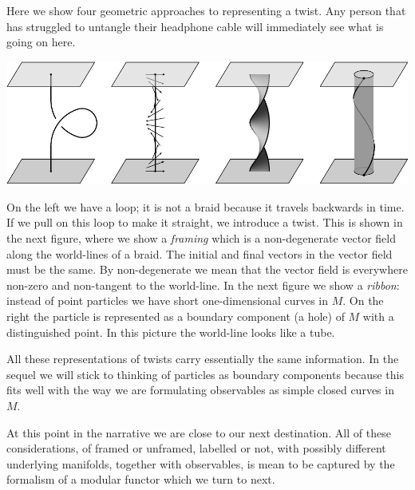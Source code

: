 \documentclass[aps, tightenlines, letterpaper, onecolumn, superscriptaddress, notitlepage, 11pt, groupedaddress]{revtex4-1}
\begin{document}
Here we show four 
geometric approaches to representing a twist.
Any person that has struggled to untangle their headphone cable
will immediately see what is going on here.
\begin{center}
\includegraphics[]{pic-framed.pdf}
\end{center}
On the left we have a loop; it is not a braid because it
travels backwards in time.
If we pull on this loop to make it straight, we introduce a twist.
This is shown in the next figure, 
where we show a \emph{framing} which is a non-degenerate 
vector field along the world-lines of a braid.
The initial and final vectors in the vector field must be the same.
By non-degenerate we mean that the vector field is everywhere
non-zero and non-tangent to the world-line.
In the next figure we show a \emph{ribbon}:
instead of point particles we have short one-dimensional curves in $M$.
On the right the particle is represented as a boundary
component (a hole) of $M$ with a distinguished point.
In this picture the world-line looks like a tube.

All these representations of twists carry
essentially the same information.
In the sequel we will stick
to thinking of particles as boundary
components because this fits well
with the way we are formulating 
observables as simple closed curves in $M$.

At this point in the narrative we are 
close to our next destination.
All of these considerations,
of framed or unframed, 
labelled or not,
with possibly different underlying manifolds,
together with observables,
is mean to
be captured by the formalism of a modular functor which we turn to next.
\end{document}
